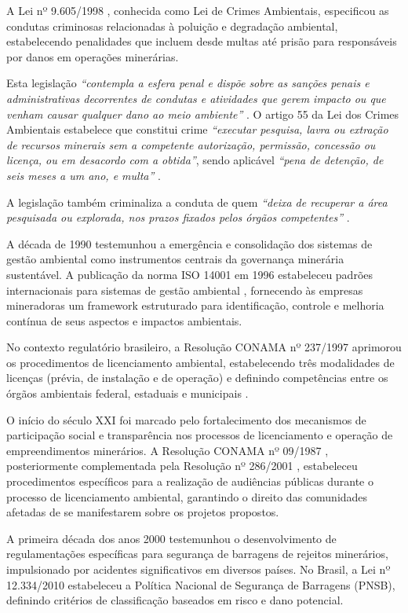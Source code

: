 A Lei nº 9.605/1998 \cite{brasil1998lei9605}, conhecida como Lei de Crimes Ambientais, especificou as condutas criminosas relacionadas à poluição e degradação ambiental, estabelecendo penalidades que incluem desde multas até prisão para responsáveis por danos em operações minerárias.

Esta legislação \textit{``contempla a esfera penal e dispõe sobre as sanções penais e administrativas decorrentes de condutas e atividades que gerem impacto ou que venham causar qualquer dano ao meio ambiente''} \cite{jazida2022leis}. O artigo 55 da Lei dos Crimes Ambientais estabelece que constitui crime \textit{``executar pesquisa, lavra ou extração de recursos minerais sem a competente autorização, permissão, concessão ou licença, ou em desacordo com a obtida''}, sendo aplicável \textit{``pena de detenção, de seis meses a um ano, e multa''} \cite{brasil1998lei9605}.

A legislação também criminaliza a conduta de quem \textit{``deixa de recuperar a área pesquisada ou explorada, nos prazos fixados pelos órgãos competentes''} \cite{brasil1998lei9605}.

A década de 1990 testemunhou a emergência e consolidação dos sistemas de gestão ambiental como instrumentos centrais da governança minerária sustentável. A publicação da norma ISO 14001 em 1996 estabeleceu padrões internacionais para sistemas de gestão ambiental \cite{abnt2015iso14001}, fornecendo às empresas mineradoras um framework estruturado para identificação, controle e melhoria contínua de seus aspectos e impactos ambientais. 

No contexto regulatório brasileiro, a Resolução CONAMA nº 237/1997 aprimorou os procedimentos de licenciamento ambiental, estabelecendo três modalidades de licenças (prévia, de instalação e de operação) e definindo competências entre os órgãos ambientais federal, estaduais e municipais \cite{conama1997resolucao237}.

O início do século XXI foi marcado pelo fortalecimento dos mecanismos de participação social e transparência nos processos de licenciamento e operação de empreendimentos minerários. A Resolução CONAMA nº 09/1987 \cite{conama1987resolucao9}, posteriormente complementada pela Resolução nº 286/2001 \cite{conama2001resolucao286}, estabeleceu procedimentos específicos para a realização de audiências públicas durante o processo de licenciamento ambiental, garantindo o direito das comunidades afetadas de se manifestarem sobre os projetos propostos.

A primeira década dos anos 2000 testemunhou o desenvolvimento de regulamentações específicas para segurança de barragens de rejeitos minerários, impulsionado por acidentes significativos em diversos países. No Brasil, a Lei nº 12.334/2010 estabeleceu a Política Nacional de Segurança de Barragens (PNSB), definindo critérios de classificação baseados em risco e dano potencial. 

